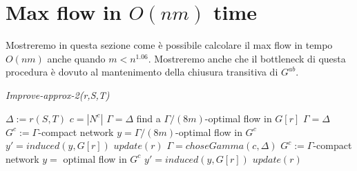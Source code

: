 \documentclass[a4paper, 11pt]{report}
\begin{document}
\section{Max flow in $O(nm)$ time}

Mostreremo in questa sezione come è possibile calcolare il max flow in tempo $O(nm)$ anche quando $m < n^{1.06}$.
Mostreremo anche che il bottleneck di questa procedura è dovuto al mantenimento della chiusura transitiva di $G^{ab}$.


\begin{algorithm}
\caption{\textit{Improve-approx-2(r,S,T)}}
\begin{algorithmic}[1]
\State $\Delta := r(S,T)$
\State $c = |N^c|$
    \State $\Gamma = \Delta$
    \State find a $\Gamma/(8m)$-optimal flow in $G[r]$
    \State $\Gamma = \Delta$
    \State $G^c:= \Gamma$-compact network
    \State $y=\Gamma/(8m)$-optimal flow in $G^c$
    \State $y' = induced(y, G[r])$
    \State $update(r)$
    $\Gamma = choseGamma(c, \Delta)$
    \State $G^c:= \Gamma$-compact network
    \State $y=$ optimal flow in $G^c$
    \State $y' = induced(y, G[r])$
    \State $update(r)$
\EndIf
\end{algorithmic}
\end{algorithm}
\end{document}
